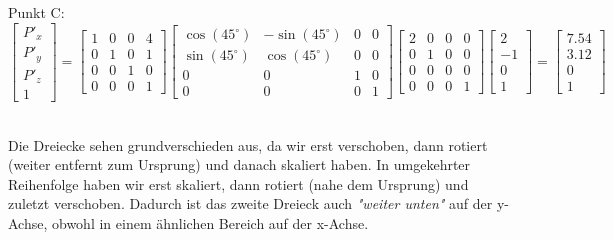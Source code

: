 \documentclass[11pt, a4paper]{article} %
\begin{document}
Punkt C: $\begin{bmatrix}
	P'_x \\ P'_y \\ P'_z \\ 1
\end{bmatrix} = \begin{bmatrix}
	1 & 0 & 0 & 4 \\ 0 & 1 & 0 & 1 \\ 0 & 0 & 1 & 0 \\ 0 & 0 & 0 & 1
\end{bmatrix} \begin{bmatrix}
	\cos(45^\circ) & -\sin(45^\circ) & 0 & 0 \\ \sin(45^\circ) & \cos(45^\circ) & 0 & 0 \\ 0 & 0 & 1 & 0 \\ 0 & 0 & 0 & 1
\end{bmatrix} \begin{bmatrix}
	2 & 0 & 0 & 0 \\ 0 & 1 & 0 & 0 \\ 0 & 0 & 0 & 0 \\ 0 & 0 & 0 & 1
\end{bmatrix} \begin{bmatrix}
	2 \\ -1 \\ 0 \\ 1
\end{bmatrix} = \begin{bmatrix}
	7.54 \\ 3.12 \\ 0 \\ 1
\end{bmatrix}$ \\
\begin{figure}[h]
\end{figure} \\
Die Dreiecke sehen grundverschieden aus, da wir erst verschoben, dann rotiert (weiter entfernt zum Ursprung) und danach skaliert haben. In umgekehrter Reihenfolge haben wir erst skaliert, dann rotiert (nahe dem Ursprung) und zuletzt verschoben. Dadurch ist das zweite Dreieck auch \textit{"weiter unten"} auf der y-Achse, obwohl in einem ähnlichen Bereich auf der x-Achse.
\end{document}
